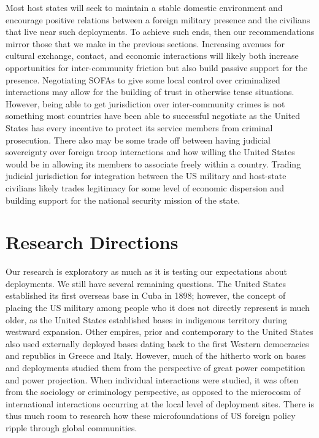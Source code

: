 Most host states will seek to maintain a stable domestic environment and encourage positive relations between a foreign military presence and the civilians that live near such deployments. To achieve such ends, then our recommendations mirror those that we make in the previous sections. Increasing avenues for cultural exchange, contact, and economic interactions will likely both increase opportunities for inter-community friction but also build passive support for the presence. Negotiating SOFAs to give some local control over criminalized interactions may allow for the building of trust in otherwise tense situations. However, being able to get jurisdiction over inter-community crimes is not something most countries have been able to successful negotiate as the United States has every incentive to protect its service members from criminal prosecution. There also may be some trade off between having judicial sovereignty over foreign troop interactions and how willing the United States would be in allowing its members to associate freely within a country. Trading judicial jurisdiction for integration between the US military and host-state civilians likely trades legitimacy for some level of economic dispersion and building support for the national security mission of the state.


\section*{Research Directions}

Our research is exploratory as much as it is testing our expectations about deployments. We still have several remaining questions. The United States established its first overseas base in Cuba in 1898; however, the concept of placing the US military among people who it does not directly represent is much older, as the United States established bases in indigenous territory during westward expansion. Other empires, prior and contemporary to the United States also used externally deployed bases dating back to the first Western democracies and republics in Greece and Italy. However, much of the hitherto work on bases and deployments studied them from the perspective of great power competition and power projection. When individual interactions were studied, it was often from the sociology or criminology perspective, as opposed to the microcosm of international interactions occurring at the local level of deployment sites. There is thus much room to research how these microfoundations of US foreign policy ripple through global communities.

